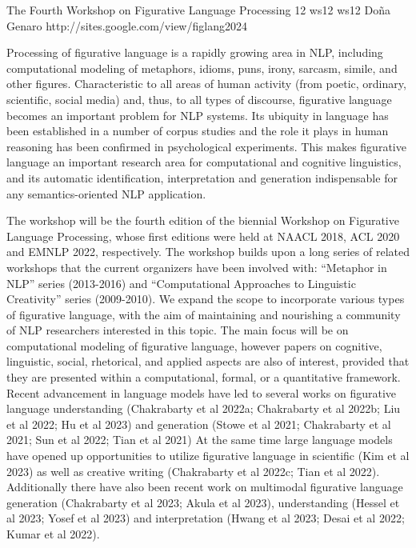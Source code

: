 \begin{wsschedulenolist}
{The Fourth Workshop on Figurative Language Processing}
{12}
{ws12}
{ws12}
{Do\~na Genaro}
{http://sites.google.com/view/figlang2024}

Processing of figurative language is a rapidly growing area in NLP, including computational modeling of metaphors, idioms, puns, irony, sarcasm, simile, and other figures.  Characteristic to all areas of human activity (from poetic, ordinary, scientific, social media) and, thus, to all types of discourse, figurative language becomes an important problem for NLP systems. Its ubiquity in language has been established in a number of corpus studies and the role it plays in human reasoning has been confirmed in psychological experiments. This makes figurative language an important research area for computational and cognitive linguistics, and its automatic identification, interpretation and generation indispensable for any semantics-oriented NLP application.

The workshop will be the fourth edition of the biennial Workshop on Figurative Language Processing, whose first editions were held at NAACL 2018, ACL 2020 and EMNLP 2022, respectively. The workshop builds upon a long series of related workshops that the current organizers have been involved with: “Metaphor in NLP” series (2013-2016) and “Computational Approaches to Linguistic Creativity” series (2009-2010). We expand the scope to incorporate various types of figurative language, with the aim of maintaining and nourishing a community of NLP researchers interested in this topic. The main focus will be on computational modeling of figurative language, however papers on cognitive, linguistic, social, rhetorical, and applied aspects are also of interest, provided that they are presented within a computational, formal, or a quantitative framework.  Recent advancement in language models have led to several works on figurative language understanding (Chakrabarty et al 2022a; Chakrabarty et al 2022b; Liu et al 2022; Hu et al 2023) and generation (Stowe et al 2021; Chakrabarty et al 2021; Sun et al 2022; Tian et al 2021)  At the same time large language models have opened up opportunities to utilize figurative language in scientific (Kim et al 2023) as well as creative writing (Chakrabarty et al 2022c; Tian et al 2022). Additionally there have also been recent work on multimodal figurative language generation (Chakrabarty et al 2023; Akula et al 2023), understanding (Hessel et al 2023; Yosef et al 2023) and interpretation (Hwang et al 2023; Desai et al 2022; Kumar et al 2022).

\end{wsschedulenolist}
